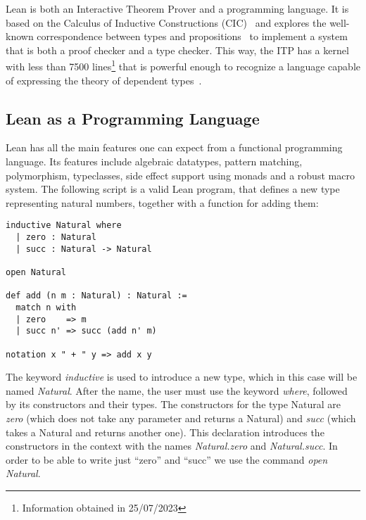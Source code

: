 
Lean is both an Interactive Theorem Prover and a programming
language. It is based on the Calculus of Inductive Constructions (CIC)~\cite{cic_ref} and explores the well-known correspondence between types and propositions~\cite{ch_correspondence} to implement a system that is both a proof checker and a type checker. This way, the ITP has a kernel with less than 7500 lines\footnote{Information obtained in 25/07/2023} that is powerful enough to recognize a language capable of expressing the theory of dependent types~\cite{dep_type_theory}.

\subsection{Lean as a Programming Language}

Lean has all the main features one can expect from a functional programming language. Its features include algebraic datatypes, pattern matching, polymorphism, typeclasses, side effect support using monads and a robust macro system. The following script is a valid Lean program, that defines a new type representing natural numbers, together with a function for adding them:

\begin{verbatim}
inductive Natural where
  | zero : Natural
  | succ : Natural -> Natural

open Natural

def add (n m : Natural) : Natural :=
  match n with
  | zero    => m
  | succ n' => succ (add n' m)

notation x " + " y => add x y
\end{verbatim}

The keyword \textit{inductive} is used to introduce a new type, which in this case will be named \textit{Natural}. After the name, the user must use the keyword \textit{where}, followed by its constructors and their types. The constructors for the type Natural are \textit{zero} (which does not take any parameter and returns a Natural) and \textit{succ} (which takes a Natural and returns another one). This declaration introduces the constructors in the context with the names \textit{Natural.zero} and \textit{Natural.succ}. In order to be able to write just ``zero'' and ``succ'' we use the command \textit{open Natural}.

